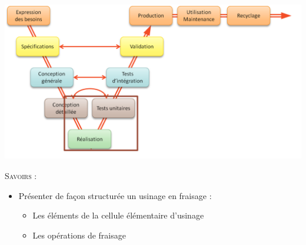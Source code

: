 \documentclass[11pt,oneside]{article}
\begin{document}
\vspace{.5cm}


\begin{center}
\includegraphics[height=7cm]{png/cycleV}
\end{center}






\begin{savoir}
\textsc{Savoirs :}
\begin{itemize}
\item Présenter de façon structurée un usinage en fraisage :
\begin{itemize}
\item Les éléments de la cellule élémentaire d'usinage
\item Les opérations de fraisage
\end{itemize}
\end{itemize}
\end{savoir}
 

\setlength{\parskip}{0ex plus 0.2ex minus 0ex}
 \renewcommand{\contentsname}{}
 \renewcommand{\baselinestretch}{1}
\end{document}
